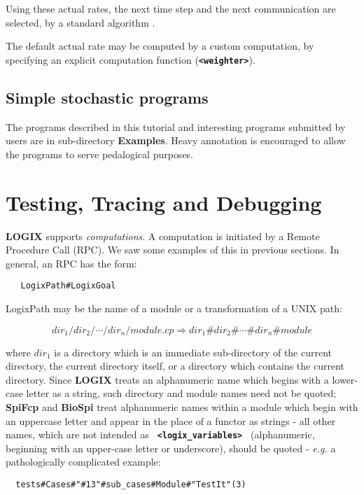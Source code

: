 \documentclass[twoside,10pt]{report}
\begin{document}
Using these actual rates, the next time step and the next
communication are selected, by a standard algorithm \cite{Gil77}.

The default actual rate may be computed by a custom computation,
by specifying an explicit computation function ({\bf \verb+<weighter>+}).

\section{Simple stochastic programs}

The programs described in this tutorial
and interesting programs submitted by users are in sub-directory
{\bf Examples}.  Heavy annotation is encouraged to allow the
programs to serve pedalogical purposes.


\chapter{Testing, Tracing and Debugging}
\label{debug}

{\bf LOGIX} supports {\em computations}.  A computation is initiated by
a Remote Procedure Call (RPC).  We saw some examples of this in
previous sections.  In general, an RPC has the form:

\begin{verbatim}
   LogixPath#LogixGoal
\end{verbatim}

\noindent
LogixPath may be the name of a module or a transformation of a UNIX path:

{\bfseries \[dir_{1}/dir_{2}/ \cdots /dir_{n}/module.cp  \Rightarrow  dir_{1}\#dir_{2}\# \cdots \#dir_{n}\#module\]
}

\noindent
where $dir_{1}$ is a directory which is an immediate sub-directory
of the current directory, the current directory itself, or a directory
which contains the current directory.
Since {\bf LOGIX} treats an alphanumeric name which begins with a lower-case
letter as a string, such directory and module names need not be quoted;
{\bf SpiFcp} and {\bf BioSpi} treat alphanumeric names within a module
which begin with an uppercase letter and
appear in the place of a functor as strings - all
other names, which are not intended as {\bf \verb+ <logix_variables> +} 
(alphanumeric,
beginning with an upper-case letter or underscore), should be quoted -
{\em e.g.} a pathologically complicated example:

\begin{verbatim}
  tests#Cases#"#13"#sub_cases#Module#"TestIt"(3)
\end{verbatim}
\end{document}
